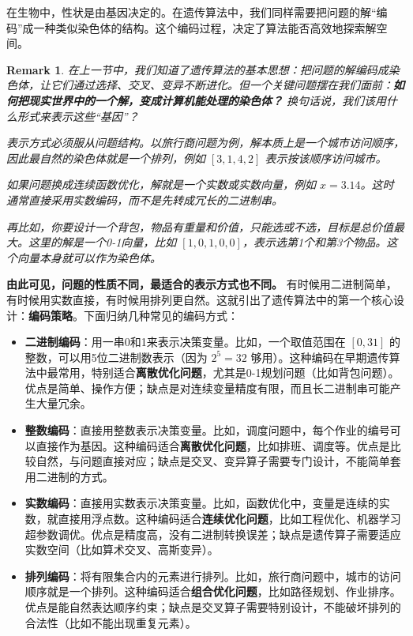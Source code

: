 \documentclass[lang=cn,zihao=-4,a4paper,fontset=windows]{beautybook}
\newtheorem*{remark}{\textbf{Remark}}
\begin{document}
在生物中，性状是由基因决定的。在遗传算法中，我们同样需要把问题的解“编码”成一种类似染色体的结构。这个编码过程，决定了算法能否高效地探索解空间。
\begin{remark}
在上一节中，我们知道了遗传算法的基本思想：把问题的解编码成染色体，让它们通过选择、交叉、变异不断进化。但一个关键问题摆在我们面前：\textbf{如何把现实世界中的一个解，变成计算机能处理的染色体？} 换句话说，我们该用什么形式来表示这些“基因”？

表示方式必须服从问题结构。以旅行商问题为例，解本质上是一个城市访问顺序，因此最自然的染色体就是一个排列，例如 \([3, 1, 4, 2]\) 表示按该顺序访问城市。

如果问题换成连续函数优化，解就是一个实数或实数向量，例如 \(x=3.14\)。这时通常直接采用实数编码，而不是先转成冗长的二进制串。

再比如，你要设计一个背包，物品有重量和价值，只能选或不选，目标是总价值最大。这里的解是一个0-1向量，比如 \([1,0,1,0,0]\)，表示选第1个和第3个物品。这个向量本身就可以作为染色体。
\end{remark}
\textbf{由此可见，问题的性质不同，最适合的表示方式也不同。} 有时候用二进制简单，有时候用实数直接，有时候用排列更自然。这就引出了遗传算法中的第一个核心设计：\textbf{编码策略}。下面归纳几种常见的编码方式：

\begin{itemize}
    \item \textbf{二进制编码}：用一串0和1来表示决策变量。比如，一个取值范围在 \([0,31]\) 的整数，可以用5位二进制数表示（因为 \(2^5=32\) 够用）。这种编码在早期遗传算法中最常用，特别适合\textbf{离散优化问题}，尤其是0-1规划问题（比如背包问题）。优点是简单、操作方便；缺点是对连续变量精度有限，而且长二进制串可能产生大量冗余。
    \item \textbf{整数编码}：直接用整数表示决策变量。比如，调度问题中，每个作业的编号可以直接作为基因。这种编码适合\textbf{离散优化问题}，比如排班、调度等。优点是比较自然，与问题直接对应；缺点是交叉、变异算子需要专门设计，不能简单套用二进制的方式。
    \item \textbf{实数编码}：直接用实数表示决策变量。比如，函数优化中，变量是连续的实数，就直接用浮点数。这种编码适合\textbf{连续优化问题}，比如工程优化、机器学习超参数调优。优点是精度高，没有二进制转换误差；缺点是遗传算子需要适应实数空间（比如算术交叉、高斯变异）。
    \item \textbf{排列编码}：将有限集合内的元素进行排列。比如，旅行商问题中，城市的访问顺序就是一个排列。这种编码适合\textbf{组合优化问题}，比如路径规划、作业排序。优点是能自然表达顺序约束；缺点是交叉算子需要特别设计，不能破坏排列的合法性（比如不能出现重复元素）。
\end{itemize}
\end{document}
